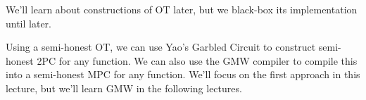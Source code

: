 We'll learn about constructions of OT later, but we black-box its implementation until later.

Using a semi-honest OT, we can use Yao's Garbled Circuit to construct semi-honest 2PC for any function. We can also use the GMW compiler to compile this into a semi-honest MPC for any function. We'll focus on the first approach in this lecture, but we'll learn GMW in the following lectures.